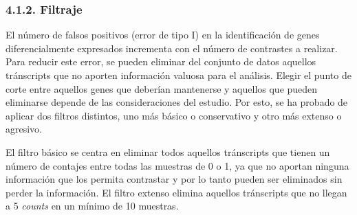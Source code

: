 \documentclass[
]{article}
\begin{document}
\begin{table}[!h]

\caption{\label{tab:unnamed-chunk-1}Muestras utilizadas para el análisis según su infiltración.}
\centering
{}
\end{table}

\hypertarget{filtraje}{%
\subsubsection{4.1.2. Filtraje}\label{filtraje}}

El número de falsos positivos (error de tipo I) en la identificación de
genes diferencialmente expresados incrementa con el número de contrastes
a realizar. Para reducir este error, se pueden eliminar del conjunto de
datos aquellos tránscripts que no aporten información valuosa para el
análisis. Elegir el punto de corte entre aquellos genes que deberían
mantenerse y aquellos que pueden eliminarse depende de las
consideraciones del estudio. Por esto, se ha probado de aplicar dos
filtros distintos, uno más básico o conservativo y otro más extenso o
agresivo.

El filtro básico se centra en eliminar todos aquellos tránscripts que
tienen un número de contajes entre todas las muestras de 0 o 1, ya que
no aportan ninguna información que los permita contrastar y por lo tanto
pueden ser eliminados sin perder la información. El filtro extenso
elimina aquellos tránscripts que no llegan a 5 \emph{counts} en un
mínimo de 10 muestras.
\end{document}
